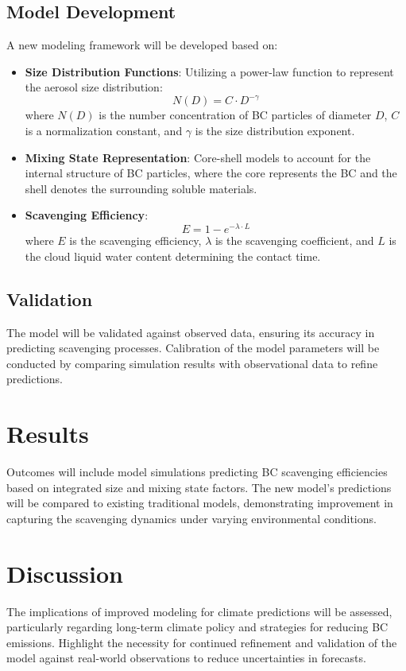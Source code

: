 \documentclass{article}
\begin{document}
\subsection{Model Development}
A new modeling framework will be developed based on:
\begin{itemize}
    \item \textbf{Size Distribution Functions}: Utilizing a power-law function to represent the aerosol size distribution:
    \begin{equation}
        N(D) = C \cdot D^{-\gamma}
    \end{equation}
    where \(N(D)\) is the number concentration of BC particles of diameter \(D\), \(C\) is a normalization constant, and \(\gamma\) is the size distribution exponent.
    \item \textbf{Mixing State Representation}: Core-shell models to account for the internal structure of BC particles, where the core represents the BC and the shell denotes the surrounding soluble materials.
    \item \textbf{Scavenging Efficiency}:
    \begin{equation}
        E = 1 - e^{-\lambda \cdot L}
    \end{equation}
    where \(E\) is the scavenging efficiency, \(\lambda\) is the scavenging coefficient, and \(L\) is the cloud liquid water content determining the contact time.
\end{itemize}

\subsection{Validation}
The model will be validated against observed data, ensuring its accuracy in predicting scavenging processes. Calibration of the model parameters will be conducted by comparing simulation results with observational data to refine predictions.

\section{Results}
Outcomes will include model simulations predicting BC scavenging efficiencies based on integrated size and mixing state factors. The new model's predictions will be compared to existing traditional models, demonstrating improvement in capturing the scavenging dynamics under varying environmental conditions.

\section{Discussion}
The implications of improved modeling for climate predictions will be assessed, particularly regarding long-term climate policy and strategies for reducing BC emissions. Highlight the necessity for continued refinement and validation of the model against real-world observations to reduce uncertainties in forecasts.
\end{document}
